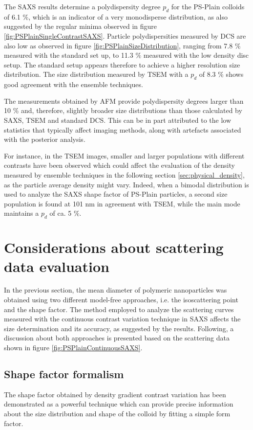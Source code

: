 The SAXS results determine a polydispersity degree $p_d$ for the PS-Plain colloids of 6.1 $\%$, which is an indicator of a very monodisperse distribution, as also suggested by the regular minima observed in figure \ref{fig:PSPlainSingleContrastSAXS}. Particle polydispersities measured by DCS are also low as observed in figure \ref{fig:PSPlainSizeDistribution}, ranging from 7.8 $\%$ measured with the standard set up, to 11.3 $\%$ measured with the low density disc setup. The standard setup appears therefore to achieve a higher resolution size distribution. The size distribution measured by TSEM with a $p_d$ of 8.3 $\%$ shows good agreement with the ensemble techniques.

The measurements obtained by AFM provide polydispersity degrees larger than 10 $\%$\citep{nicolet_inter-laboratory_2016} and, therefore, slightly broader size distributions than those calculated by SAXS, TSEM and standard DCS. This can be in part attributed to the low statistics that typically affect imaging methods, along with artefacts associated with the posterior analysis.

For instance, in the TSEM images\citep{nicolet_inter-laboratory_2016}, smaller and larger populations with different contrasts have been observed which could affect the evaluation of the density measured by ensemble techniques in the following section \ref{sec:physical_density}, as the particle average density might vary. Indeed, when a bimodal distribution is used to analyze the SAXS shape factor of PS-Plain particles, a second size population is found at 101 nm in agreement with TSEM, while the main mode maintains a $p_d$ of ca. 5 $\%$.

\section{Considerations about scattering data evaluation}

In the previous section, the mean diameter of polymeric nanoparticles was obtained using two different model-free approaches, i.e. the isoscattering point and the shape factor. The method employed to analyze the scattering curves measured with the continuous contrast variation technique in SAXS affects the size determination and its accuracy, as suggested by the results. Following, a discussion about both approaches is presented based on the scattering data shown in figure \ref{fig:PSPlainContinuousSAXS}.

\subsection{Shape factor formalism}
The shape factor obtained by density gradient contrast variation has been demonstrated as a powerful technique which can provide precise information about the size distribution and shape of the colloid by fitting a simple form factor.

